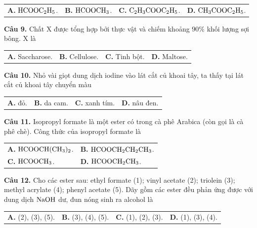 \documentclass{article}
\begin{document}
\begin{tabularx}{\linewidth}{@{}X X X X@{}}
\textbf{A.} $\ce{HCOOC2H5}$. & \textbf{B.} $\ce{HCOOCH3}$. & \textbf{C.} $\ce{C2H3COOC2H5}$. & \textbf{D.} $\ce{CH3COOC2H5}$.
\end{tabularx}

\vspace*{\fill}

\textbf{Câu 9.} Chất X được tổng hợp bởi thực vật và chiếm khoảng $90\%$ khối lượng sợi bông. X là
\vspace{8pt}

\begin{tabularx}{\linewidth}{@{}X X X X@{}}
\textbf{A.} Saccharose. & \textbf{B.} Cellulose. & \textbf{C.} Tinh bột. & \textbf{D.} Maltose.
\end{tabularx}
\vspace*{\fill}
\newpage

\fontsize{29}{39}\selectfont
\textbf{Câu 10.} Nhỏ vài giọt dung dịch iodine vào lát cắt củ khoai tây, ta thấy tại lát cắt củ khoai tây chuyển màu
\vspace{8pt}

\begin{tabularx}{\linewidth}{@{}X X X X@{}}
\textbf{A.} đỏ. & \textbf{B.} da cam. & \textbf{C.} xanh tím. & \textbf{D.} nâu đen.
\end{tabularx}

\vspace*{\fill}

\textbf{Câu 11.} Isopropyl formate là một ester có trong cà phê Arabica (còn gọi là cà phê chè). Công thức của isopropyl formate là
\vspace{8pt}

\begin{tabularx}{\linewidth}{@{}X X@{}}
\textbf{A.} $\ce{HCOOCH(CH3)2}$. & \textbf{B.} $\ce{HCOOCH2CH2CH3}$.\\[8pt]
\textbf{C.} $\ce{HCOOCH3}$. & \textbf{D.} $\ce{HCOOCH2CH3}$.
\end{tabularx}
\vspace*{\fill}
\newpage

\fontsize{28}{37}\selectfont
\textbf{Câu 12.} Cho các ester sau: ethyl formate (1); vinyl acetate (2); triolein (3); methyl acrylate (4); phenyl acetate (5). Dãy gồm các ester đều phản ứng được với dung dịch $\ce{NaOH}$ dư, đun nóng sinh ra alcohol là
\vspace{8pt}

\begin{tabularx}{\linewidth}{@{}X X X X@{}}
\textbf{A.} (2), (3), (5). & \textbf{B.} (3), (4), (5). & \textbf{C.} (1), (2), (3). & \textbf{D.} (1), (3), (4).
\end{tabularx}
\end{document}

